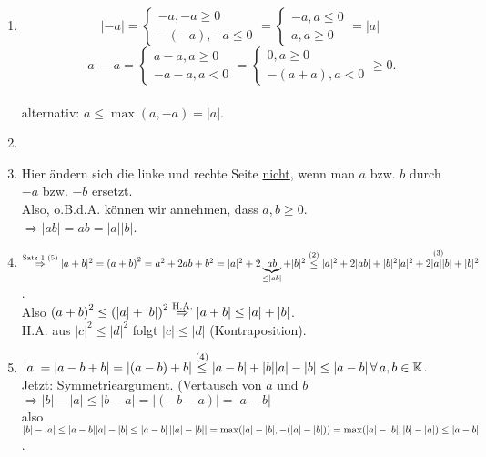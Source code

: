 \documentclass[../ana1.tex]{subfiles}
\begin{document}
\begin{bew}\leavevmode
	\begin{enumerate}
		\item 
		\[|-a| =
		\begin{cases}
			-a, -a \geq 0 \\
			-(-a), -a \leq 0
		\end{cases}
		= \begin{cases}
			-a, a \leq 0 \\
			a, a \geq 0
		\end{cases}
		= |a|\]
		\[|a| - a =
			\begin{cases}
				a-a,a\geq 0 \\
				-a-a, a<0
			\end{cases}
			= \begin{cases}
				0, a \geq 0 \\
				-(a+a), a<0
			\end{cases} \geq 0.\]\\
		alternativ: \(a \leq \max(a, -a) = \left|a\right|\).
		\item
		\item Hier ändern sich die linke und rechte Seite \underline{nicht}, wenn man \(a\) bzw. \(b\) durch \(-a\) bzw. \(-b\) ersetzt.\\
		      Also, o.B.d.A. können wir annehmen, dass \(a,b \geq 0\).\\
		      \(\Rightarrow |ab| = ab = |a||b|\).
		\item \(\overset{\text{Satz 1 (5)}}{\Rightarrow} |a+b|^2 = {(a+b)}^2=a^2+2ab+b^2=|a|^2 + 2\underbrace{ab}_{\leq |ab|} + |b|^2\\
			\overset{\text{(2)}}{\leq} |a|^2 + 2|ab| + |b|^2\\
			\overset{\text{(3)}}{|a|^2 + 2|a||b| + |b|^2}\).\\
			Also \({(a+b)}^2 \leq {(|a| + | b|)}^2\\
			\overset{\text{H.A.}}{\Rightarrow}|a+b| \leq |a|+|b|\).\\
			H.A. aus \(|c|^2 \leq |d|^2\) folgt \(|c| \leq |d|\) (Kontraposition).
		\item \(|a| = |a-b+b| = |(a-b) + b| \overset{\text{(4)}}{\leq} |a-b| + |b|\\
			|a|-|b|\leq |a-b| \,\forall\, a,b\in\mathbb{K}\). \\
			Jetzt: Symmetrieargument. (Vertausch von \(a\) und \(b\) \\
			\(\Rightarrow |b| - |a| \leq |b-a| = |{(-b-a)}| = |a-b|\) \\
			also \(|b|-|a| \leq |a-b|\\
			|a|-|b| \leq |a-b|\\
			\left| |a|-|b|\right| = \max(|a|-|b|, - (|a|-|b|)) =\max(|a|-|b|, |b|-|a|) \leq |a-b|\).
	\end{enumerate}
\end{bew}
\end{document}
